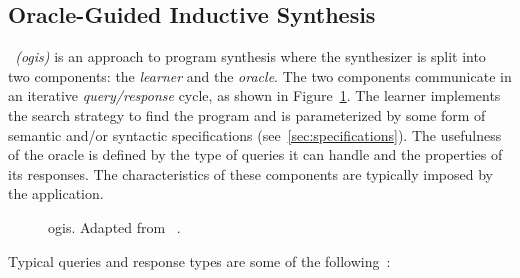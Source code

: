 \subsection{Oracle-Guided Inductive Synthesis}
\label{sec:ogis}

\textit{~(\Gls{ogis})} is an approach to program synthesis
where the synthesizer is split into two components: the \textit{learner} and the
\textit{oracle}.
The two components communicate in an iterative \textit{query/response} cycle, as
shown in Figure~\ref{fig:ogis}.
The learner implements the search strategy to find the program and is
parameterized by some form of semantic and/or syntactic specifications
(see~\ref{sec:specifications}).
The usefulness of the oracle is defined by the type of queries it can handle and
the properties of its responses. The characteristics of these components are
typically imposed by the application.

\begin{figure}[htb]
  \centering
  \caption{\Acrlong{ogis}. Adapted from
    \protect\citeauthor{Jha:2017:TFS}~\protect\cite{Jha:2017:TFS}.}
  \label{fig:ogis}
\end{figure}

Typical queries and response types are some of the following~\cite{Jha:2017:TFS}:

